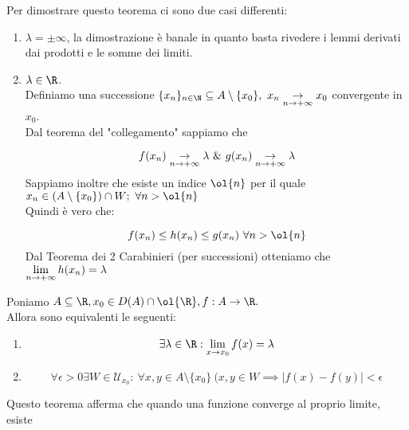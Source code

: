 \documentclass[../analisi.tex]{subfiles}
\begin{document}
\begin{dimo}
Per dimostrare questo teorema ci sono due casi differenti:

\begin{enumerate}
	\item $\lambda = \pm\infty$, la dimostrazione è banale in quanto basta 
		rivedere i lemmi derivati dai prodotti e le somme dei limiti.
	\item $\lambda \in \R$.\\
		Definiamo una successione $\{x_n\}_{n \in \N} \subseteq A
		\setminus \{x_0\},\ x_n \underset{\nti}{\to} x_0$ 
		convergente in $x_0$.\\
		Dal teorema del "collegamento" sappiamo che 

		\begin{equation}
			f(x_n) \underset{\nti}{\to} \lambda\ \&\
			g(x_n) \underset{\nti}{\to} \lambda
		\end{equation}
		Sappiamo inoltre che esiste un indice $\ol{n}$ per il quale
		$x_n \in (A \setminus \{ x_0 \}) \cap W;\ \forall n > \ol{n}$\\
		Quindi è vero che:

		\begin{equation}
			f(x_n) \leq h(x_n) \leq g(x_n)\ \forall n > \ol{n}
		\end{equation}
		Dal Teorema dei 2 Carabinieri (per successioni) otteniamo che
		$\lim \limits_{n \to + \infty} h(x_n) = \lambda$
\end{enumerate}
	
\end{dimo}
\begin{defn}[Cauchy]
Poniamo $\acr, x_0 \in D(A) \cap \ol{\R}, f: A \to \R.$\\
Allora sono equivalenti le seguenti:

\begin{enumerate}
	\item 
	\begin{equation}
		\exists \lambda \in \R: \limxo f(x) = \lambda
	\end{equation}
	\item 
	\begin{equation}
		\forall \epsilon > 0 \exists W \in \mathcal{U}_{x_0}:\
		\forall x,y \in A \setminus \{ x_0 \}\
		(x,y \in W \implies | f(x) - f(y)| < \epsilon
	\end{equation}
\end{enumerate}
\end{defn}
Questo teorema afferma che quando una funzione converge al proprio limite, esiste
\end{document}
